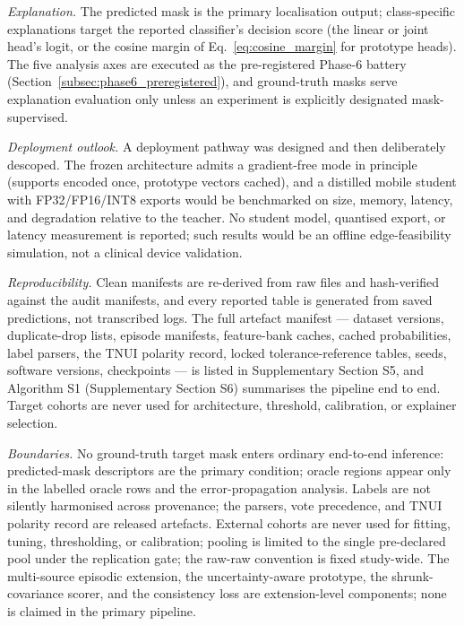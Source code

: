 \documentclass[jimh,article,submit,moreauthors,pdftex]{Definitions/tsp}
\begin{document}
\emph{Explanation.}\label{subsec:explanation_method} The predicted mask
is the primary localisation output; class-specific explanations target
the reported classifier's decision score (the linear or joint head's
logit, or the cosine margin of Eq.~\eqref{eq:cosine_margin} for
prototype heads). The five analysis axes are executed as the
pre-registered Phase-6 battery
(Section~\ref{subsec:phase6_preregistered}), and ground-truth masks
serve explanation evaluation only unless an experiment is explicitly
designated mask-supervised.

\emph{Deployment outlook.}\label{subsec:edge_method} A deployment
pathway was designed and then deliberately descoped. The frozen
architecture admits a gradient-free mode in principle (supports encoded
once, prototype vectors cached), and a distilled mobile student with
FP32/FP16/INT8 exports would be benchmarked on size, memory, latency,
and degradation relative to the teacher. No student model, quantised
export, or latency measurement is reported; such results would be an
offline edge-feasibility simulation, not a clinical device validation.

\emph{Reproducibility.}\label{subsec:reproducibility} Clean manifests
are re-derived from raw files and hash-verified against the audit
manifests, and every reported table is generated from saved predictions,
not transcribed logs. The full artefact manifest --- dataset versions,
duplicate-drop lists, episode manifests, feature-bank caches, cached
probabilities, label parsers, the TNUI polarity record, locked
tolerance-reference tables, seeds, software versions, checkpoints ---
is listed in Supplementary Section S5, and Algorithm
S1\label{subsec:algorithm_summary} (Supplementary Section S6)
summarises the pipeline end to end. Target cohorts are never used for
architecture, threshold, calibration, or explainer selection.

\emph{Boundaries.} No ground-truth target mask enters ordinary
end-to-end inference: predicted-mask descriptors are the primary
condition; oracle regions appear only in the labelled oracle rows and
the error-propagation analysis. Labels are not silently harmonised
across provenance; the parsers, vote precedence, and TNUI polarity
record are released artefacts. External cohorts are never used for
fitting, tuning, thresholding, or calibration; pooling is limited to
the single pre-declared pool under the replication gate; the raw-raw
convention is fixed study-wide. The multi-source episodic extension,
the uncertainty-aware prototype, the shrunk-covariance scorer, and the
consistency loss are extension-level components; none is claimed in the
primary pipeline.
\end{document}
